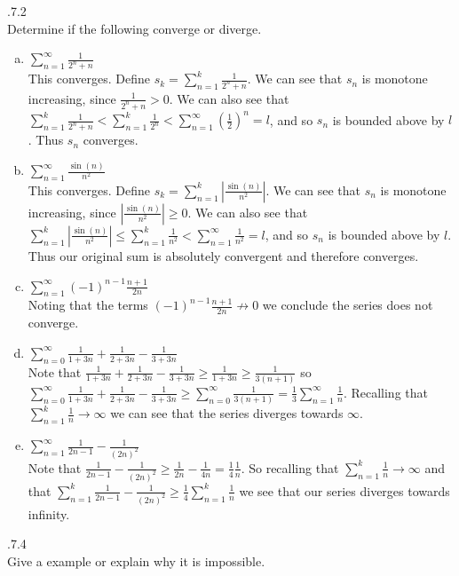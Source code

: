 \documentclass[12pt]{article}
\makeatletter
\theoremstyle{homework}
\newenvironment{exercise}[1]
{\def\@currentlabel{#1}\exercisecore}
{\endexercisecore}
\makeatother
\begin{document}
\begin{exercise}

2.7.2\\
Determine if the following converge or diverge.
\end{exercise}
\begin{enumerate}[(a)]
\item
$\sum_{n=1}^{\infty}\frac{1}{2^n+n}$\\
This converges.  Define $s_k=\sum_{n=1}^{k}\frac{1}{2^n+n}$.  We can see that $s_n$ is monotone increasing, since $\frac{1}{2^n+n}>0$.  We can also see that $\sum_{n=1}^{k}\frac{1}{2^n+n}<\sum_{n=1}^{k}\frac{1}{2^n}<\sum_{n=1}^{\infty}(\frac{1}{2})^n=l$, and so $s_n$ is bounded above by $l$.  Thus $s_n$ converges.
\item
$\sum_{n=1}^{\infty}\frac{\sin(n)}{n^2}$\\
This converges.  Define $s_k=\sum_{n=1}^{k}|\frac{\sin(n)}{n^2}|$.  We can see that $s_n$ is monotone increasing, since $|\frac{\sin(n)}{n^2}|\geq 0$.  We can also see that $\sum_{n=1}^{k}|\frac{\sin(n)}{n^2}|\leq \sum_{n=1}^{k}\frac{1}{n^2}<\sum_{n=1}^{\infty}\frac{1}{n^2}=l$, and so $s_n$ is bounded above by $l$.  Thus our original sum is absolutely convergent and therefore converges.
\item
$\sum_{n=1}^{\infty}(-1)^{n-1}\frac{n+1}{2n}$\\
Noting that the terms $(-1)^{n-1}\frac{n+1}{2n}\not\rightarrow 0$ we conclude the series does not converge.
\item
$\sum_{n=0}^{\infty} \frac{1}{1+3n}+\frac{1}{2+3n}-\frac{1}{3+3n}$\\
Note that $\frac{1}{1+3n}+\frac{1}{2+3n}-\frac{1}{3+3n}\geq \frac{1}{1+3n}\geq \frac{1}{3(n+1)}$ so $\sum_{n=0}^{\infty} \frac{1}{1+3n}+\frac{1}{2+3n}-\frac{1}{3+3n}\geq \sum_{n=0}^{\infty}\frac{1}{3(n+1)}= \frac{1}{3}\sum_{n=1}^{\infty}\frac{1}{n}$.  Recalling that $\sum_{n=1}^{k}\frac{1}{n} \rightarrow \infty$ we can see that the series diverges towards $\infty$.
\item
$\sum_{n=1}^{\infty} \frac{1}{2n-1}-\frac{1}{(2n)^2}$\\
Note that $\frac{1}{2n-1}-\frac{1}{(2n)^2}\geq \frac{1}{2n}-\frac{1}{4n}=\frac{1}{4}\frac{1}{n}$.  So recalling that $\sum_{n=1}^{k}\frac{1}{n} \rightarrow \infty$ and that $\sum_{n=1}^{k} \frac{1}{2n-1}-\frac{1}{(2n)^2}\geq \frac{1}{4}\sum_{n=1}^{k}\frac{1}{n}$ we see that our series diverges towards infinity.
\end{enumerate}
\begin{exercise}

2.7.4\\
Give a example or explain why it is impossible.
\end{exercise}
\end{document}
